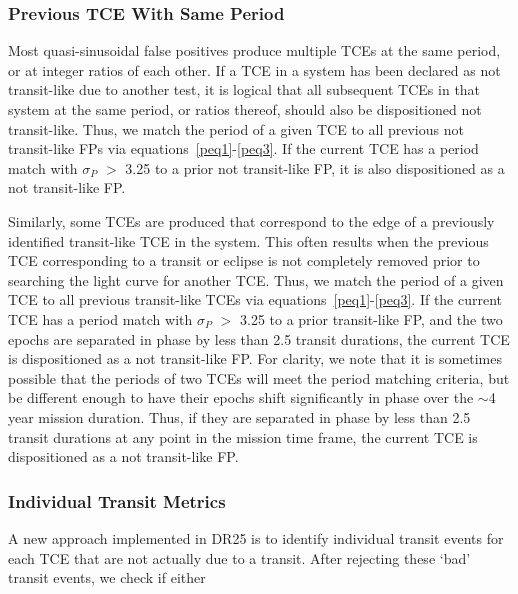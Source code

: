 

\subsubsection{Previous TCE With Same Period}

Most quasi-sinusoidal false positives produce multiple TCEs at the same period, or at integer ratios of each other. If a TCE in a system has been declared as not transit-like due to another test, it is logical that all subsequent TCEs in that system at the same period, or ratios thereof, should also be dispositioned not transit-like. Thus, we match the period of a given TCE to all previous not transit-like FPs via equations~\ref{peq1}-\ref{peq3}. If the current TCE has a period match with $\sigma_{P}$ $>$ 3.25 to a prior not transit-like FP, it is also dispositioned as a not transit-like FP.

Similarly, some TCEs are produced that correspond to the edge of a previously identified transit-like TCE in the system. This often results when the previous TCE corresponding to a transit or eclipse is not completely removed prior to searching the light curve for another TCE. Thus, we match the period of a given TCE to all previous transit-like TCEs via equations~\ref{peq1}-\ref{peq3}.  If the current TCE has a period match with $\sigma_{P}$ $>$ 3.25 to a prior transit-like FP, and the two epochs are separated in phase by less than 2.5 transit durations, the current TCE is dispositioned as a not transit-like FP. For clarity, we note that it is sometimes possible that the periods of two TCEs will meet the period matching criteria, but be different enough to have their epochs shift significantly in phase over the $\sim$4 year mission duration. Thus, if they are separated in phase by less than 2.5 transit durations at any point in the mission time frame, the current TCE is dispositioned as a not transit-like FP.



\subsubsection{Individual Transit Metrics}

A new approach implemented in DR25 is to identify individual transit events for each TCE that are not actually due to a transit. After rejecting these `bad' transit events, we check if either

